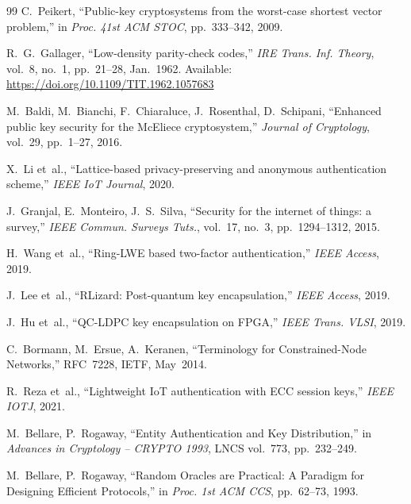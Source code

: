 \documentclass[conference]{IEEEtran}
\begin{document}
\begin{thebibliography}{99}
C.~Peikert,
``Public-key cryptosystems from the worst-case shortest vector problem,''
in \textit{Proc. 41st ACM STOC}, pp.~333--342, 2009.

R.~G.~Gallager,
``Low-density parity-check codes,''
\textit{IRE Trans. Inf. Theory}, vol.~8, no.~1, pp.~21--28, Jan.~1962.
Available: \url{https://doi.org/10.1109/TIT.1962.1057683}

M.~Baldi, M.~Bianchi, F.~Chiaraluce, J.~Rosenthal, D.~Schipani,
``Enhanced public key security for the {McEliece} cryptosystem,''
\textit{Journal of Cryptology}, vol.~29, pp.~1--27, 2016.

X.~Li et~al.,
``Lattice-based privacy-preserving and anonymous authentication scheme,''
\textit{IEEE IoT Journal}, 2020.

J.~Granjal, E.~Monteiro, J.~S.~Silva,
``Security for the internet of things: a survey,''
\textit{IEEE Commun. Surveys Tuts.}, vol.~17, no.~3,
pp.~1294--1312, 2015.

H.~Wang et~al.,
``Ring-{LWE} based two-factor authentication,''
\textit{IEEE Access}, 2019.

J.~Lee et~al.,
``{RLizard}: Post-quantum key encapsulation,''
\textit{IEEE Access}, 2019.

J.~Hu et~al.,
``{QC-LDPC} key encapsulation on {FPGA},''
\textit{IEEE Trans. VLSI}, 2019.

C.~Bormann, M.~Ersue, A.~Keranen,
``Terminology for Constrained-Node Networks,''
RFC~7228, IETF, May~2014.

R.~Reza et~al.,
``Lightweight {IoT} authentication with {ECC} session keys,''
\textit{IEEE IOTJ}, 2021.

M.~Bellare, P.~Rogaway,
``Entity Authentication and Key Distribution,''
in \textit{Advances in Cryptology -- CRYPTO 1993}, LNCS vol.~773,
pp.~232--249.

M.~Bellare, P.~Rogaway,
``Random Oracles are Practical: A Paradigm for Designing Efficient
Protocols,''
in \textit{Proc. 1st ACM CCS}, pp.~62--73, 1993.

\end{thebibliography}
\end{document}

